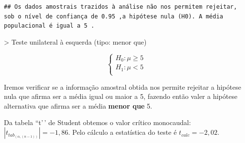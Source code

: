 \documentclass[
]{book}
\begin{document}
\begin{verbatim}
## Os dados amostrais trazidos à análise não nos permitem rejeitar, sob o nível de confiança de 0.95 ,a hipótese nula (H0). A média populacional é igual a 5 .
\end{verbatim}

\hfill\break
\textgreater{} Teste unilateral à esquerda (tipo: menor que)

\hfill\break

\[
\begin{cases}
H_{0}: \mu \ge 5\\
H_{1}: \mu < 5\\
\end{cases}
\]

\hfill\break

Iremos verificar se a informação amostral obtida nos permite rejeitar a hipótese nula que afirma ser a média igual ou maior a 5, fazendo então valer a hipótese alternativa que afirma ser a média \textbf{menor que} 5.

\hfill\break

Da tabela ``t'\,' de Student obtemos o valor crítico monocaudal: \(|{t}_{tab_(\alpha, (n-1))}|=-1,86\). Pelo cálculo a estatística do teste é \(t_{calc}=-2,02\).

\hfill\break
\end{document}
